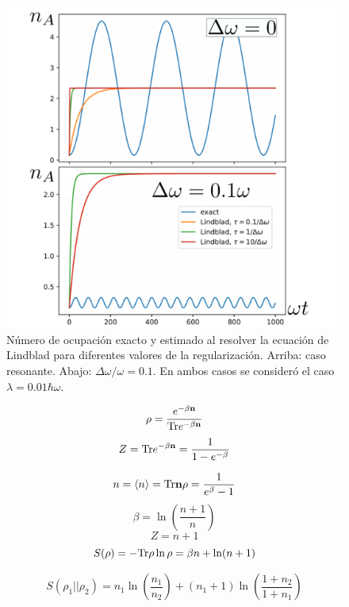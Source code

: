 \documentclass{report} %
\numberwithin{equation}{section}
\begin{document}
\begin{figure}
  \centering
  \includegraphics[scale = 1]{figs/model3.1.3_lindblad-vs-exact.png}
  \caption{Número de ocupación exacto y estimado al resolver la ecuación de Lindblad para diferentes valores de la regularización. Arriba: caso resonante. Abajo: $\Delta \omega/\omega=0.1$. En ambos casos se consider\'o el caso $\lambda=0.01 \hbar \omega$.}
  \label{fig:model3.1.3_lindblad-vs-exact}
\end{figure}

\begin{Omitir}

\begin{equation}
\rho=\frac{e^{-\beta {\bf n}}}{{\Tr}e^{-\beta {\bf n}}}
\end{equation}
$$
Z={\Tr}{e^{-\beta {\bf n}}} = \frac{1}{1-e^{-\beta}}
$$

$$
n= \langle n\rangle ={\Tr}{\bf n}\rho = \frac{1}{e^{\beta}-1}
$$
$$
\beta=\ln(\frac{n+1}{n})
$$
$$
Z=n+1
$$
$$
S(\rho)=-{\Tr}\rho \ln \rho = \beta n +\ln(n+1)
$$

$$
S(\rho_1||\rho_2)=n_1 \ln(\frac{n_1}{n_2})+ (n_1+1)\ln(\frac{1+n_2}{1+n_1})
$$
\end{Omitir}
\end{document}
